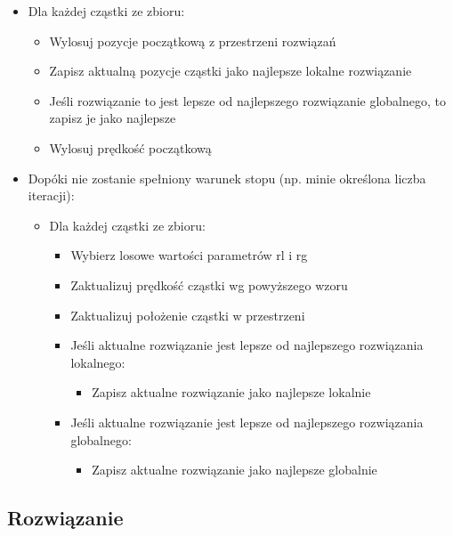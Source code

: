 \documentclass[11pt]{article}
\providecommand{\tightlist}{%
      \setlength{\itemsep}{0pt}\setlength{\parskip}{0pt}}
\begin{document}
\begin{itemize}
\tightlist
\item
  Dla każdej cząstki ze zbioru:

  \begin{itemize}
  \tightlist
  \item
    Wylosuj pozycje początkową z przestrzeni rozwiązań
  \item
    Zapisz aktualną pozycje cząstki jako najlepsze lokalne rozwiązanie
  \item
    Jeśli rozwiązanie to jest lepsze od najlepszego rozwiązanie
    globalnego, to zapisz je jako najlepsze
  \item
    Wylosuj prędkość początkową
  \end{itemize}
\item
  Dopóki nie zostanie spełniony warunek stopu (np. minie określona
  liczba iteracji):

  \begin{itemize}
  \tightlist
  \item
    Dla każdej cząstki ze zbioru:

    \begin{itemize}
    \tightlist
    \item
      Wybierz losowe wartości parametrów rl i rg
    \item
      Zaktualizuj prędkość cząstki wg powyższego wzoru
    \item
      Zaktualizuj położenie cząstki w przestrzeni
    \item
      Jeśli aktualne rozwiązanie jest lepsze od najlepszego rozwiązania
      lokalnego:

      \begin{itemize}
      \tightlist
      \item
        Zapisz aktualne rozwiązanie jako najlepsze lokalnie
      \end{itemize}
    \item
      Jeśli aktualne rozwiązanie jest lepsze od najlepszego rozwiązania
      globalnego:

      \begin{itemize}
      \tightlist
      \item
        Zapisz aktualne rozwiązanie jako najlepsze globalnie
      \end{itemize}
    \end{itemize}
  \end{itemize}
\end{itemize}

    \hypertarget{rozwiux105zanie}{%
\subsection{Rozwiązanie}\label{rozwiux105zanie}}
\end{document}
